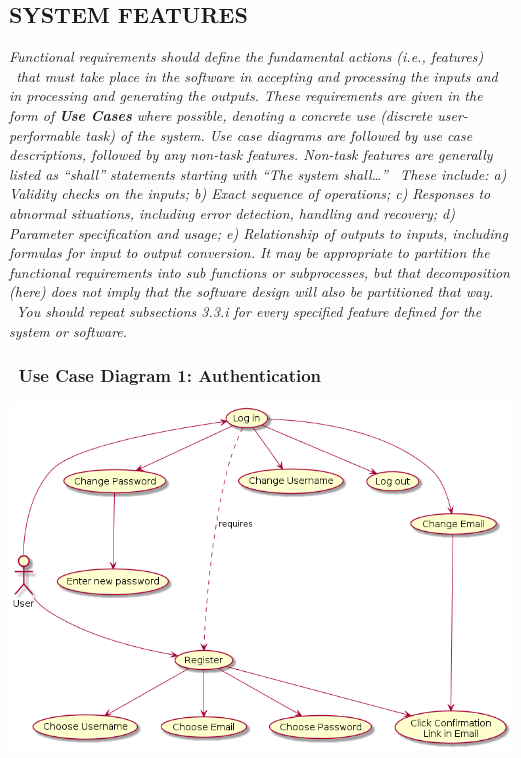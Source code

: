 \documentclass[twoside,letterpaper]{article}
\begin{document}
\subsection[SYSTEM FEATURES]{\rmfamily\bfseries\color{black} SYSTEM FEATURES}
\hypertarget{RefHeading21659017292}{}{\itshape\color{black}
Functional requirements should define the fundamental actions (i.e., features) \ that must take place in the software in
accepting and processing the inputs and in processing and generating the outputs. These requirements are given in the
form of \textbf{Use Cases} where possible, denoting a concrete use (discrete user-performable task) of the system. Use
case diagrams are followed by use case descriptions, followed by any non-task features. Non-task features are generally
listed as ``shall'' statements starting with ``The system shall{\dots}'' \ These include: a) Validity checks on the
inputs; b) Exact sequence of operations; c) Responses to abnormal situations, including error detection, handling and
recovery; d) Parameter specification and usage; e) Relationship of outputs to inputs, including formulas for input to
output conversion. \newline
\newline
It may be appropriate to partition the functional requirements into sub functions or subprocesses, but that
decomposition (here) does not imply that the software design will also be partitioned that way. \ You should repeat
subsections 3.3.i for every specified feature defined for the system or software.}

\subsubsection[Use Case Diagram 1: Authentication]{\foreignlanguage{english}{\ Use Case Diagram 1: Authentication}}
\hypertarget{RefHeading21859017292}{}{\color{black}
}

\includegraphics[width=\textwidth]{images/UseCaseDiagrams/Authentication}
\end{document}
